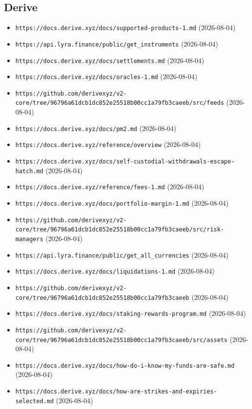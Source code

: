 \subsection*{Derive}
\begin{itemize}\setlength{\itemsep}{0pt}\small
\item \texttt{https://docs.derive.xyz/docs/supported-products-1.md} (2026-08-04)
\item \texttt{https://api.lyra.finance/public/get\_instruments} (2026-08-04)
\item \texttt{https://docs.derive.xyz/docs/settlements.md} (2026-08-04)
\item \texttt{https://docs.derive.xyz/docs/oracles-1.md} (2026-08-04)
\item \texttt{https://github.com/derivexyz/v2-core/tree/96796a61dcb1dc852e25518b00cc1a79fb3caeeb/src/feeds} (2026-08-04)
\item \texttt{https://docs.derive.xyz/docs/pm2.md} (2026-08-04)
\item \texttt{https://docs.derive.xyz/reference/overview} (2026-08-04)
\item \texttt{https://docs.derive.xyz/docs/self-custodial-withdrawals-escape-hatch.md} (2026-08-04)
\item \texttt{https://docs.derive.xyz/reference/fees-1.md} (2026-08-04)
\item \texttt{https://docs.derive.xyz/docs/portfolio-margin-1.md} (2026-08-04)
\item \texttt{https://github.com/derivexyz/v2-core/tree/96796a61dcb1dc852e25518b00cc1a79fb3caeeb/src/risk-managers} (2026-08-04)
\item \texttt{https://api.lyra.finance/public/get\_all\_currencies} (2026-08-04)
\item \texttt{https://docs.derive.xyz/docs/liquidations-1.md} (2026-08-04)
\item \texttt{https://github.com/derivexyz/v2-core/tree/96796a61dcb1dc852e25518b00cc1a79fb3caeeb} (2026-08-04)
\item \texttt{https://docs.derive.xyz/docs/staking-rewards-program.md} (2026-08-04)
\item \texttt{https://github.com/derivexyz/v2-core/tree/96796a61dcb1dc852e25518b00cc1a79fb3caeeb/src/assets} (2026-08-04)
\item \texttt{https://docs.derive.xyz/docs/how-do-i-know-my-funds-are-safe.md} (2026-08-04)
\item \texttt{https://docs.derive.xyz/docs/how-are-strikes-and-expiries-selected.md} (2026-08-04)
\end{itemize}

